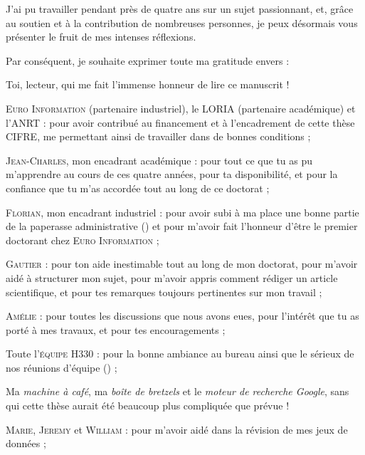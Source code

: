 \begin{ThesisAcknowledgments}

	J'ai pu travailler pendant près de quatre ans sur un sujet passionnant, et, grâce au soutien et à la contribution de nombreuses personnes, je peux désormais vous présenter le fruit de mes intenses réflexions.
	
	Par conséquent, je souhaite exprimer toute ma gratitude envers :
	\begin{todolist}
		\item[\itemok] Toi, lecteur, qui me fait l'immense honneur de lire ce manuscrit ! \faThumbsUp
		\item[\itemok] \textsc{Euro Information} (partenaire industriel), le \textsc{LORIA} (partenaire académique) et l'\textsc{ANRT} :
		pour avoir contribué au financement et à l’encadrement de cette thèse CIFRE, me permettant ainsi de travailler dans de bonnes conditions ;
		\item[\itemok] \textsc{Jean-Charles}, mon encadrant académique :
		pour tout ce que tu as pu m'apprendre au cours de ces quatre années, pour ta disponibilité, et pour la confiance que tu m'as accordée tout au long de ce doctorat ;
		\item[\itemok] \textsc{Florian}, mon encadrant industriel :
		pour avoir subi à ma place une bonne partie de la paperasse administrative (\faGrinTongueWink) et pour m'avoir fait l'honneur d'être le premier doctorant chez \textsc{Euro Information} ;
		\item[\itemok] \textsc{Gautier} :
		pour ton aide inestimable tout au long de mon doctorat, pour m'avoir aidé à structurer mon sujet, pour m'avoir appris comment rédiger un article scientifique, et pour tes remarques toujours pertinentes sur mon travail ;
		\item[\itemok] \textsc{Amélie} : pour toutes les discussions que nous avons eues, pour l’intérêt que tu as porté à mes travaux, et pour tes encouragements ;
		\item[\itemok] Toute l'\textsc{équipe H330} : pour la bonne ambiance au bureau ainsi que le sérieux de nos réunions d'équipe (\faGrinTongueWink) ;
		\item[\itemok] Ma \textit{machine à café}, ma \textit{boîte de bretzels} et le \textit{moteur de recherche Google}, sans qui cette thèse aurait été beaucoup plus compliquée que prévue ! \faGrinBeamSweat
		\item[\itemok] \textsc{Marie}, \textsc{Jeremy} et \textsc{William} : pour m'avoir aidé dans la révision de mes jeux de données ;

\end{todolist}
\end{ThesisAcknowledgments}
